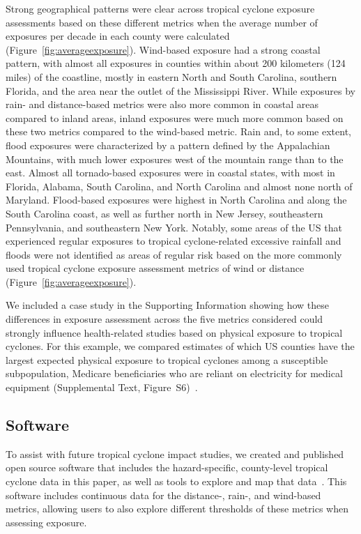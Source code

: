 Strong geographical patterns were clear across tropical cyclone exposure
assessments based on these different metrics when the average number of
exposures per decade in each county were calculated 
(Figure~\ref{fig:averageexposure}). Wind-based exposure had a strong coastal pattern,
with almost all exposures in counties within about 200 kilometers (124 miles)
of the coastline, mostly in eastern North and South Carolina, southern Florida,
and the area near the outlet of the Mississippi River. While exposures by rain-
and distance-based metrics were also more common in coastal areas compared to
inland areas, inland exposures were much more common based on these two metrics
compared to the wind-based metric. Rain and, to some extent, flood exposures
were characterized by a pattern defined by the Appalachian Mountains, with much
lower exposures west of the mountain range than to the east. Almost all
tornado-based exposures were in coastal states, with most in Florida, Alabama,
South Carolina, and North Carolina and almost none north of Maryland.
Flood-based exposures were highest in North Carolina and along the South
Carolina coast, as well as further north in New Jersey, southeastern
Pennsylvania, and southeastern New York. Notably, some areas of the \ac{US} that
experienced regular exposures to tropical cyclone-related excessive rainfall
and floods were not identified as areas of regular risk based on the more
commonly used tropical cyclone exposure assessment metrics of wind or distance
(Figure~\ref{fig:averageexposure}). 

We included a case study in the Supporting Information showing how these
differences in exposure assessment across the five metrics considered could
strongly influence health-related studies based on physical exposure to
tropical cyclones. For this example, we compared estimates of which \ac{US}
counties have the largest expected physical exposure to tropical cyclones among
a susceptible subpopulation, Medicare beneficiaries who are reliant on
electricity for medical equipment (Supplemental Text, Figure~S6)~\citep{empower}.

\subsection*{Software}

To assist with future tropical cyclone impact studies, we created and published
open source software that includes the hazard-specific, county-level tropical
cyclone data in this paper, as well as tools to explore and map that 
data~\citep{hurricaneexposure, hurricaneexposuredata}. This software includes continuous
data for the distance-, rain-, and wind-based metrics, allowing users to also explore
different thresholds of these metrics when assessing exposure.

